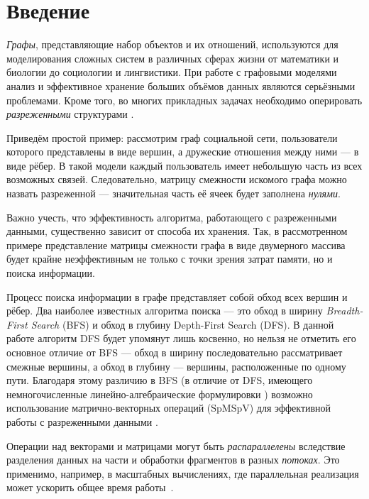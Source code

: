 
\section*{Введение}
\thispagestyle{withCompileDate}

\textit{Графы}, представляющие набор объектов и их отношений, используются для моделирования сложных систем в различных сферах жизни от математики и биологии до социологии и лингвистики. 
При работе с графовыми моделями анализ и эффективное хранение больших объёмов данных являются серьёзными проблемами. Кроме того, во многих прикладных задачах необходимо оперировать \textit{разреженными} структурами  \cite{doak2005understanding} \cite{john2010continuous} \cite{rao2021embedding}.

Приведём простой пример: рассмотрим граф социальной сети, пользователи которого представлены в виде вершин, а дружеские отношения между ними --- в виде рёбер. В такой модели каждый пользователь имеет небольшую часть из всех возможных связей. Следовательно, матрицу смежности искомого графа можно назвать разреженной --- значительная часть её ячеек будет заполнена \textit{нулями}. 

Важно учесть, что эффективность алгоритма, работающего с разреженными данными, существенно зависит от способа их хранения. Так, в рассмотренном примере представление матрицы смежности графа в виде двумерного массива будет крайне неэффективным не только с точки зрения затрат памяти, но и поиска информации.

Процесс поиска информации в графе представляет собой обход всех вершин и рёбер. Два наиболее известных алгоритма поиска --- это обход в ширину \textit{Breadth-First Search} (BFS) и обход в глубину Depth-First Search (DFS). В данной работе алгоритм DFS будет упомянут лишь косвенно, но нельзя не отметить его основное отличие от BFS --- обход в ширину последовательно рассматривает смежные вершины, а обход в глубину --- вершины, расположенные по одному пути. Благодаря этому различию в BFS (в отличие от DFS, имеющего немногочисленные линейно-алгебраические формулировки \cite{spampinato2019linear}) возможно использование матрично-векторных операций (SpMSpV) для эффективной работы с разреженными данными \cite{LinearAlgebra-basedGraphFramework}.

Операции над векторами и матрицами могут быть \textit{распараллелены} вследствие разделения данных на части и обработки фрагментов в разных \textit{потоках}. Это применимо, например, в масштабных вычислениях, где параллельная реализация может ускорить общее время работы~\cite{parhami2019parallel}.

